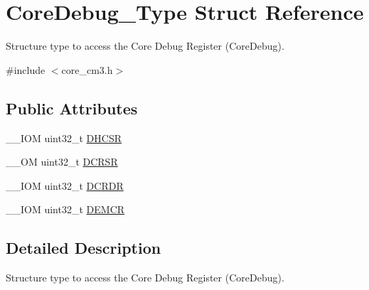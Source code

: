 \hypertarget{struct_core_debug___type}{\section{Core\-Debug\-\_\-\-Type Struct Reference}
\label{struct_core_debug___type}
}


Structure type to access the Core Debug Register (Core\-Debug).  




{\ttfamily \#include $<$core\-\_\-cm3.\-h$>$}

\subsection*{Public Attributes}
\begin{DoxyCompactItemize}
\item 
\-\_\-\-\_\-\-I\-O\-M uint32\-\_\-t \hyperlink{struct_core_debug___type_ad63554e4650da91a8e79929cbb63db66}{D\-H\-C\-S\-R}
\item 
\-\_\-\-\_\-\-O\-M uint32\-\_\-t \hyperlink{struct_core_debug___type_af907cf64577eaf927dac6787df6dd98b}{D\-C\-R\-S\-R}
\item 
\-\_\-\-\_\-\-I\-O\-M uint32\-\_\-t \hyperlink{struct_core_debug___type_aab3cc92ef07bc1f04b3a3aa6db2c2d55}{D\-C\-R\-D\-R}
\item 
\-\_\-\-\_\-\-I\-O\-M uint32\-\_\-t \hyperlink{struct_core_debug___type_aeb3126abc4c258a858f21f356c0df6ee}{D\-E\-M\-C\-R}
\end{DoxyCompactItemize}


\subsection{Detailed Description}
Structure type to access the Core Debug Register (Core\-Debug). 

